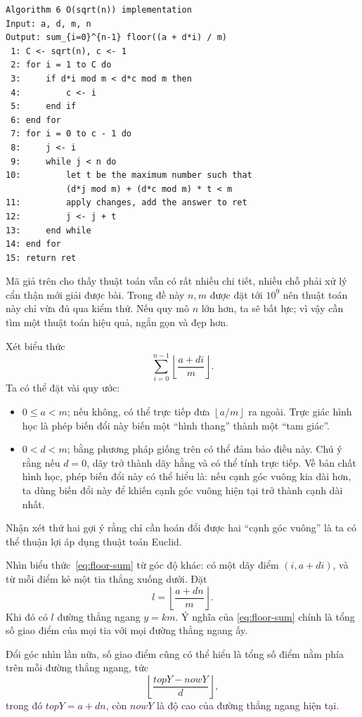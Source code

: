 \documentclass[11pt]{article}
\newcommand{\floor}[1]{\left\lfloor #1\right\rfloor}
\begin{document}
\begin{verbatim}
Algorithm 6 O(sqrt(n)) implementation
Input: a, d, m, n
Output: sum_{i=0}^{n-1} floor((a + d*i) / m)
 1: C <- sqrt(n), c <- 1
 2: for i = 1 to C do
 3:     if d*i mod m < d*c mod m then
 4:         c <- i
 5:     end if
 6: end for
 7: for i = 0 to c - 1 do
 8:     j <- i
 9:     while j < n do
10:         let t be the maximum number such that
            (d*j mod m) + (d*c mod m) * t < m
11:         apply changes, add the answer to ret
12:         j <- j + t
13:     end while
14: end for
15: return ret
\end{verbatim}

Mã giả trên cho thấy thuật toán vẫn có rất nhiều chi tiết, nhiều chỗ phải xử
lý cẩn thận mới giải được bài. Trong đề này $n,m$ được đặt tới $10^9$ nên
thuật toán này chỉ vừa đủ qua kiểm thử. Nếu quy mô $n$ lớn hơn, ta sẽ bất lực;
vì vậy cần tìm một thuật toán hiệu quả, ngắn gọn và đẹp hơn.

Xét biểu thức
\begin{equation}
  \sum_{i=0}^{n-1}\floor{\frac{a+di}{m}}.
  \label{eq:floor-sum}
\end{equation}
Ta có thể đặt vài quy ước:
\begin{itemize}
  \item $0\le a<m$; nếu không, có thể trực tiếp đưa $\floor{a/m}$ ra ngoài.
  Trực giác hình học là phép biến đổi này biến một ``hình thang'' thành một
  ``tam giác''.
  \item $0<d<m$; bằng phương pháp giống trên có thể đảm bảo điều này. Chú ý
  rằng nếu $d=0$, dãy trở thành dãy hằng và có thể tính trực tiếp. Về bản chất
  hình học, phép biến đổi này có thể hiểu là: nếu cạnh góc vuông kia dài hơn,
  ta dùng biến đổi này để khiến cạnh góc vuông hiện tại trở thành cạnh dài
  nhất.
\end{itemize}

Nhận xét thứ hai gợi ý rằng chỉ cần hoán đổi được hai ``cạnh góc vuông'' là
ta có thể thuận lợi áp dụng thuật toán Euclid.

Nhìn biểu thức~\eqref{eq:floor-sum} từ góc độ khác: có một dãy điểm
$(i,a+di)$, và từ mỗi điểm kẻ một tia thẳng xuống dưới. Đặt
\[
  l=\floor{\frac{a+dn}{m}}.
\]
Khi đó có $l$ đường thẳng ngang $y=km$. Ý nghĩa của
\eqref{eq:floor-sum} chính là tổng số giao điểm của mọi tia với mọi đường
thẳng ngang ấy.

Đổi góc nhìn lần nữa, số giao điểm cũng có thể hiểu là tổng số điểm nằm phía
trên mỗi đường thẳng ngang, tức
\[
  \floor{\frac{\mathit{topY}-\mathit{nowY}}{d}},
\]
trong đó $\mathit{topY}=a+dn$, còn $\mathit{nowY}$ là độ cao của đường thẳng
ngang hiện tại.
\end{document}
